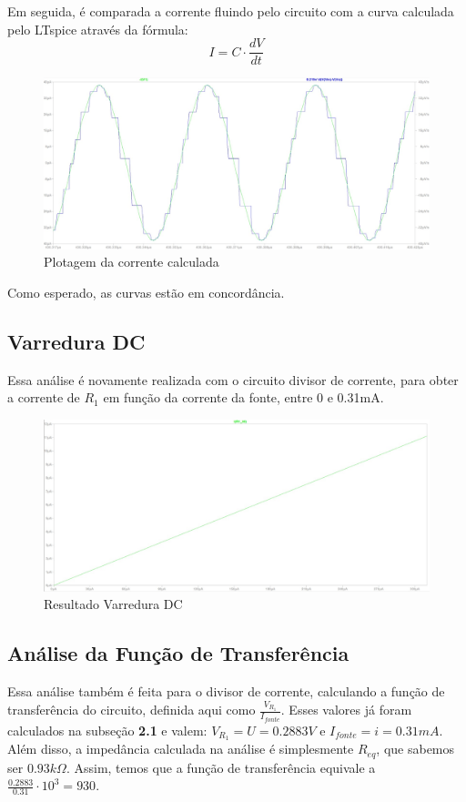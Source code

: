 \documentclass[10pt,twocolumn,letterpaper]{article}
\begin{document}
Em seguida, é comparada a corrente fluindo pelo circuito com a curva calculada pelo LTspice através da fórmula:
\[I = C\cdot\frac{dV}{dt}\]

\begin{figure}[h]
\caption{Plotagem da corrente calculada}
\includegraphics[scale=0.15]{figuras/fig10}
\end{figure}

Como esperado, as curvas estão em concordância.

\subsection{Varredura DC}

Essa análise é novamente realizada com o circuito divisor de corrente, para obter a corrente de $R_1$ em função da corrente da fonte, entre 0 e 0.31mA.\newpage

\begin{figure}[h]
\caption{Resultado Varredura DC}
\includegraphics[scale=0.15]{figuras/fig11}
\end{figure}

\subsection{Análise da Função de Transferência}

Essa análise também é feita para o divisor de corrente, calculando a função de transferência do circuito, definida aqui como $\frac{V_{R_1}}{I_{fonte}}$. Esses valores já foram calculados na subseção \textbf{2.1} e valem: $V_{R_1} = U = 0.2883V$ e $I_{fonte} = i = 0.31mA$. Além disso, a impedância calculada na análise é simplesmente $R_{eq}$, que sabemos ser $0.93k\Omega$. Assim, temos que a função de transferência equivale a $\frac{0.2883}{0.31}\cdot10^3=930$.
\end{document}
